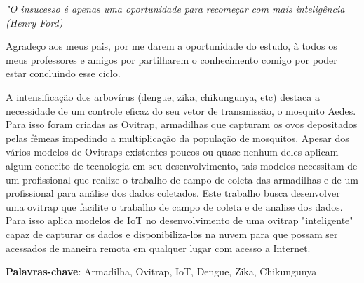 \documentclass[
	12pt,				%
	openright,			%
	oneside,			%
	a4paper,			%
	chapter=TITLE,		%
	english,			%
	brazil				%
	]{abntex2}
\begin{document}
	



\newpage
\begin{epigrafe}
    \vspace*{\fill}
	\begin{flushright}
		\textit{"O insucesso é apenas uma oportunidade para recomeçar com mais inteligência\\
		(Henry Ford)}
	\end{flushright}
\end{epigrafe}


\begin{agradecimentos}
Agradeço aos meus pais, por me darem a oportunidade do estudo, à todos os meus professores e amigos por partilharem o conhecimento comigo por poder estar concluindo esse ciclo.

\end{agradecimentos}




\setlength{\absparsep}{18pt} %

\begin{resumo}

A intensificação dos arbovírus (dengue, zika, chikungunya, etc) destaca a necessidade de um controle eficaz do seu vetor de transmissão, o mosquito Aedes. Para isso foram criadas as Ovitrap, armadilhas que capturam os ovos depositados pelas fêmeas impedindo a multiplicação da população de mosquitos. Apesar dos vários modelos de Ovitraps existentes poucos ou quase nenhum deles aplicam algum conceito de tecnologia em seu desenvolvimento, tais modelos necessitam de um profissional que realize o trabalho de campo de coleta das armadilhas e de um profissional para análise dos dados coletados. Este trabalho busca desenvolver uma ovitrap que facilite o trabalho de campo de coleta e de analise dos dados. Para isso aplica modelos de IoT no desenvolvimento de uma ovitrap "inteligente" capaz de capturar os dados e disponibiliza-los na nuvem para que possam ser acessados de maneira remota em qualquer lugar com acesso a Internet.

\textbf{Palavras-chave}:  Armadilha, Ovitrap, IoT, Dengue, Zika, Chikungunya

\end{resumo}
\end{document}

